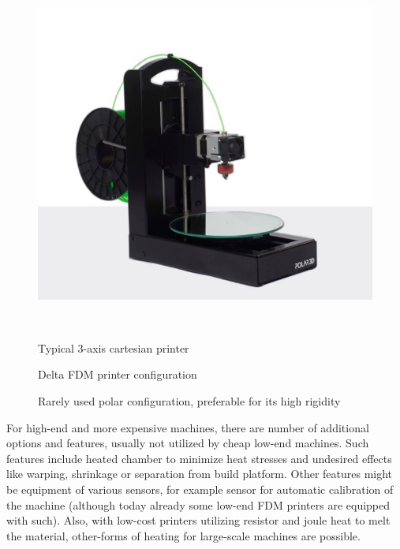 \documentclass[a4paper, 11pt, reqno]{report}
\begin{document}
\begin{figure}[h]
\begin{minipage}[b]{0.3\textwidth}
  \end{minipage}
  \hfill
  \begin{minipage}[b]{0.3\textwidth}
    \includegraphics[width=\textwidth]{polarPrinter}
  \end{minipage}
  \\[5pt]
  
  \begin{minipage}[t]{0.3\textwidth}
    \caption{Typical 3-axis cartesian printer}
  \end{minipage}
  \hfill
  \begin{minipage}[t]{0.3\textwidth}
    \caption{Delta FDM printer configuration}
  \end{minipage}
  \hfill
  \begin{minipage}[t]{0.3\textwidth}
    \caption{Rarely used polar configuration, preferable for its high rigidity}
  \end{minipage}
  
\end{figure}
	For high-end and more expensive machines, there are number of additional options and features, usually not utilized by cheap low-end machines. Such features include heated chamber to minimize heat stresses and undesired effects like warping, shrinkage or separation from build platform. Other features might be equipment of various sensors, for example sensor for automatic calibration of the machine (although today already some low-end FDM printers are equipped with such). Also, with low-cost printers utilizing resistor and joule heat to melt the material, other-forms of heating for large-scale machines are possible.
\end{document}
